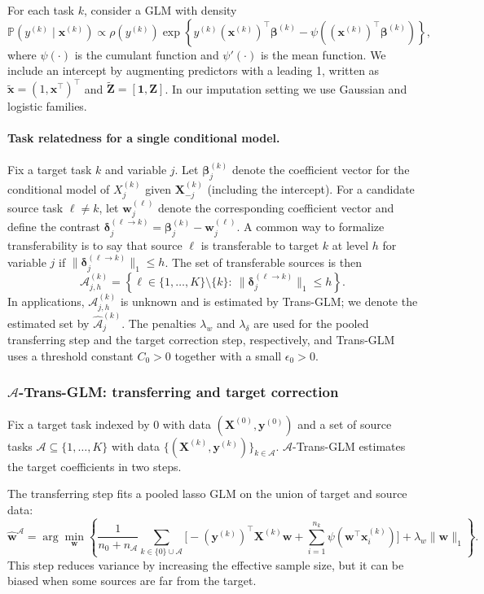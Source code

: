 \documentclass[12pt]{article}
\begin{document}
For each task $k$, consider a GLM with density
\[
\mathbb{P}(y^{(k)}\mid \bm{x}^{(k)}) \propto \rho(y^{(k)})\exp\left\{y^{(k)}(\bm{x}^{(k)})^\top \bm{\beta}^{(k)}-\psi\!\left((\bm{x}^{(k)})^\top \bm{\beta}^{(k)}\right)\right\},
\]
where $\psi(\cdot)$ is the cumulant function and $\psi'(\cdot)$ is the mean function. We include an intercept by augmenting predictors with
a leading 1, written as $\tilde{\bm{x}}=(1,\bm{x}^\top)^\top$ and $\tilde{\bm{Z}}=[\bm{1},\bm{Z}]$. In our imputation setting we use
Gaussian and logistic families.

\paragraph{Task relatedness for a single conditional model.}
Fix a target task $k$ and variable $j$. Let $\bm{\beta}^{(k)}_j$ denote the coefficient vector for the conditional model of $X^{(k)}_j$
given $\bm{X}^{(k)}_{-j}$ (including the intercept). For a candidate source task $\ell\neq k$, let $\bm{w}^{(\ell)}_j$ denote the
corresponding coefficient vector and define the contrast
\(\bm{\delta}^{(\ell\to k)}_j=\bm{\beta}^{(k)}_j-\bm{w}^{(\ell)}_j.\)
A common way to formalize transferability is to say that source $\ell$ is transferable to target $k$ at level $h$ for variable $j$ if
$\|\bm{\delta}^{(\ell\to k)}_j\|_1\le h$. The set of transferable sources is then
\[
\mathcal{A}^{(k)}_{j,h}=\left\{\ell\in\{1,\dots,K\}\setminus\{k\}:\ \|\bm{\delta}^{(\ell\to k)}_j\|_1\le h\right\}.
\]
In applications, $\mathcal{A}^{(k)}_{j,h}$ is unknown and is estimated by Trans-GLM; we denote the estimated set by $\widehat{\mathcal{A}}^{(k)}_j$.
The penalties $\lambda_w$ and $\lambda_\delta$ are used for the pooled transferring step and the target correction step, respectively, and Trans-GLM
uses a threshold constant $C_0>0$ together with a small $\epsilon_0>0$.

\subsubsection{$\mathcal{A}$-Trans-GLM: transferring and target correction}
\label{subsubsec:atransglm}
Fix a target task indexed by $0$ with data $(\bm{X}^{(0)},\bm{y}^{(0)})$ and a set of source tasks $\mathcal{A}\subseteq\{1,\dots,K\}$
with data $\{(\bm{X}^{(k)},\bm{y}^{(k)})\}_{k\in\mathcal{A}}$. $\mathcal{A}$-Trans-GLM estimates the target coefficients in two steps.

The transferring step fits a pooled lasso GLM on the union of target and source data:
\[
\hat{\bm{w}}^{\mathcal{A}}
=\arg\min_{\bm{w}}
\left\{
\frac{1}{n_0+n_{\mathcal{A}}}\sum_{k\in\{0\}\cup\mathcal{A}}
\Big[-(\bm{y}^{(k)})^\top \bm{X}^{(k)}\bm{w}+\sum_{i=1}^{n_k}\psi(\bm{w}^\top \bm{x}^{(k)}_i)\Big]
+\lambda_w\|\bm{w}\|_1
\right\}.
\]
This step reduces variance by increasing the effective sample size, but it can be biased when some sources are far from the target.
\end{document}
